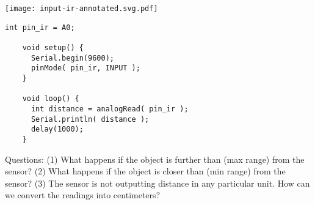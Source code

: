 \vspace{0.1in}
\begin{minipage}[t]{0.49\tw}
  \vspace{0pt}

  \texttt{[image: input-ir-annotated.svg.pdf]}
\end{minipage}
\hfill
\begin{minipage}[t]{0.49\tw}
  \vspace{0.1in}
  \begin{Verbatim}[gobble=3,fontsize=\small]
    int pin_ir = A0;

    void setup() {
      Serial.begin(9600);
      pinMode( pin_ir, INPUT );
    }

    void loop() {
      int distance = analogRead( pin_ir );
      Serial.println( distance );
      delay(1000);
    }
  \end{Verbatim}
\end{minipage}
\vspace{0.1in}

Questions: (1) What happens if the object is further than  (max
range) from the sensor? (2) What happens if the object is closer than
 (min range) from the sensor? (3) The sensor is not outputting
distance in any particular unit. How can we convert the readings into
centimeters?

